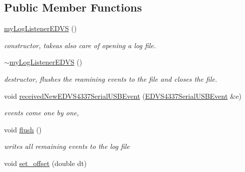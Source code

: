 \subsection*{Public Member Functions}
\begin{DoxyCompactItemize}
\item 
\hypertarget{classmy_log_listener_e_d_v_s_acf61bf49fd9cf235a4498411b44e9aa2}{}\hyperlink{classmy_log_listener_e_d_v_s_acf61bf49fd9cf235a4498411b44e9aa2}{my\+Log\+Listener\+E\+D\+V\+S} ()\label{classmy_log_listener_e_d_v_s_acf61bf49fd9cf235a4498411b44e9aa2}

\begin{DoxyCompactList}\small\item\em constructor, takeas also care of opening a log file. \end{DoxyCompactList}\item 
\hypertarget{classmy_log_listener_e_d_v_s_ac2c38d50f2e0830ac3f4433608939997}{}\hyperlink{classmy_log_listener_e_d_v_s_ac2c38d50f2e0830ac3f4433608939997}{$\sim$my\+Log\+Listener\+E\+D\+V\+S} ()\label{classmy_log_listener_e_d_v_s_ac2c38d50f2e0830ac3f4433608939997}

\begin{DoxyCompactList}\small\item\em destructor, flushes the reamining events to the file and closes the file. \end{DoxyCompactList}\item 
\hypertarget{classmy_log_listener_e_d_v_s_a1777d000440b6f85d49dd49ff89b2429}{}void \hyperlink{classmy_log_listener_e_d_v_s_a1777d000440b6f85d49dd49ff89b2429}{received\+New\+E\+D\+V\+S4337\+Serial\+U\+S\+B\+Event} (\hyperlink{struct_e_d_v_s4337_serial_u_s_b_event}{E\+D\+V\+S4337\+Serial\+U\+S\+B\+Event} \&e)\label{classmy_log_listener_e_d_v_s_a1777d000440b6f85d49dd49ff89b2429}

\begin{DoxyCompactList}\small\item\em events come one by one, \end{DoxyCompactList}\item 
\hypertarget{classmy_log_listener_e_d_v_s_a765267309b967a51266bec88b618dae4}{}void \hyperlink{classmy_log_listener_e_d_v_s_a765267309b967a51266bec88b618dae4}{flush} ()\label{classmy_log_listener_e_d_v_s_a765267309b967a51266bec88b618dae4}

\begin{DoxyCompactList}\small\item\em writes all remaining events to the log file \end{DoxyCompactList}\item 
\hypertarget{classmy_log_listener_e_d_v_s_a98d36489262e95d277ba8183443d2b85}{}void \hyperlink{classmy_log_listener_e_d_v_s_a98d36489262e95d277ba8183443d2b85}{set\+\_\+offset} (double dt)\label{classmy_log_listener_e_d_v_s_a98d36489262e95d277ba8183443d2b85}


\end{DoxyCompactItemize}
